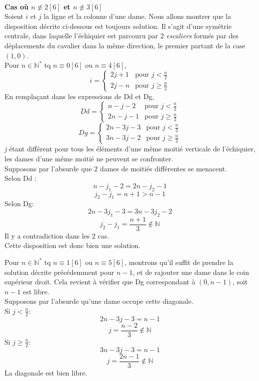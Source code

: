 \documentclass[a4paper]{article}
\begin{document}
\paragraph{}
\textbf{Cas où $n\not\equiv 2\left[6\right]$ et $n\not\equiv 3\left[6\right] $}
\vspace{0.5em}\\
Soient $i$ et $j$ la ligne et la colonne d'une dame. Nous allons montrer que la disposition décrite ci-dessous est toujours solution. Il s'agit d'une symétrie centrale, dans laquelle l'échiquier est parcouru par $2$ \textit{escaliers} formés par des déplacements du cavalier dans la même direction, le premier partant de la case $(1,0)$.\\
\vspace{0.5em}
Pour $n \in \mathbb{N}^{*}$ tq $n\equiv 0[6]$ ou $n\equiv 4[6]$,
\[i=\begin{cases}
2j+1 & \text{pour } j<\frac{n}{2}\\
2j-n & \text{pour } j\geqslant\frac{n}{2}
\end{cases} \]
En remplaçant dans les expressions de Dd et Dg,
\[Dd=\begin{cases}
n-j-2 & \text{pour } j<\frac{n}{2}\\
2n-j-1 & \text{pour } j\geqslant\frac{n}{2}
\end{cases} \]
\[Dg=\begin{cases}
2n-3j-3 & \text{pour } j<\frac{n}{2}\\
3n-3j-2 & \text{pour } j\geqslant\frac{n}{2}
\end{cases} \]
\textit{j} étant différent pour tous les éléments d'une même moitié verticale de l'échiquier, les dames d'une même moitié ne peuvent se confronter.\\
Supposons par l'absurde que $2$ dames de moitiés différentes se menacent.\\
Selon Dd :
\[ n-j_{1}-2=2n-j_{2}-1 \]
\[ j_{2}-j_{1}=n+1>n-1 \]
Selon Dg:
\[ 2n-3j_{1}-3 = 3n-3j_{2}-2 \]
\[ j_{2}-j_{1} = \frac{n+1}{3}\not  \in \mathbb{N} \]
Il y a contradiction dans les 2 cas.\\
Cette disposition est donc bien une solution.\\
\vspace{0.5em}

\newpage
Pour $n \in \mathbb{N}^{*}$ tq $n\equiv 1[6]$ ou $n\equiv 5[6]$, montrons qu'il suffit de prendre la solution décrite précédemment pour $n-1$, et de rajouter une dame dans le coin supérieur droit. Cela revient à vérifier que Dg correspondant à $(0,n-1)$, soit $n-1$ est libre.\\
Supposons par l'absurde qu'une dame occupe cette diagonale.\\
Si $j<\frac{n}{2}$:
\[ 2n-3j-3=n-1 \]
\[ j=\frac{n-2}{3}\not  \in \mathbb{N} \]
Si $j\geqslant\frac{n}{2}$:
\[ 3n-3j-3=n-1 \]
\[ j=\frac{2n-1}{3}\not  \in \mathbb{N} \]
La diagonale est bien libre.
\end{document}
